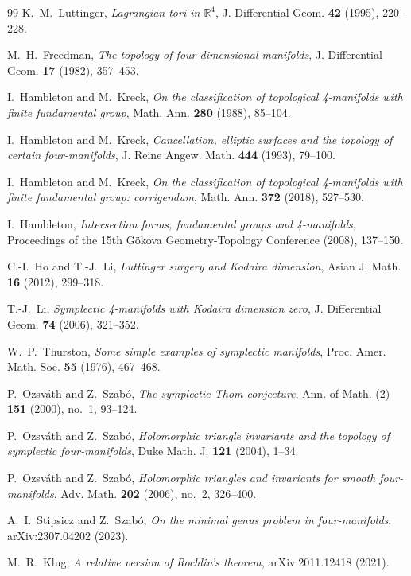 \documentclass[11pt]{article}
\newcommand{\R}{\mathbb{R}}
\theoremstyle{definition}
\begin{document}
\begin{thebibliography}{99}
K.~M.~Luttinger,
\emph{Lagrangian tori in $\R^4$},
J. Differential Geom. \textbf{42} (1995), 220--228.

M.~H.~Freedman,
\emph{The topology of four-dimensional manifolds},
J. Differential Geom. \textbf{17} (1982), 357--453.

I.~Hambleton and M.~Kreck,
\emph{On the classification of topological 4-manifolds with finite
fundamental group},
Math. Ann. \textbf{280} (1988), 85--104.

I.~Hambleton and M.~Kreck,
\emph{Cancellation, elliptic surfaces and the topology of certain
four-manifolds},
J. Reine Angew. Math. \textbf{444} (1993), 79--100.

I.~Hambleton and M.~Kreck,
\emph{On the classification of topological 4-manifolds with finite
fundamental group: corrigendum},
Math. Ann. \textbf{372} (2018), 527--530.

I.~Hambleton,
\emph{Intersection forms, fundamental groups and 4-manifolds},
Proceedings of the 15th G\"okova Geometry-Topology Conference (2008),
137--150.

C.-I.~Ho and T.-J.~Li,
\emph{Luttinger surgery and Kodaira dimension},
Asian J. Math. \textbf{16} (2012), 299--318.

T.-J.~Li,
\emph{Symplectic 4-manifolds with Kodaira dimension zero},
J. Differential Geom. \textbf{74} (2006), 321--352.

W.~P.~Thurston,
\emph{Some simple examples of symplectic manifolds},
Proc. Amer. Math. Soc. \textbf{55} (1976), 467--468.

P.~Ozsv\'ath and Z.~Szab\'o,
\emph{The symplectic Thom conjecture},
Ann. of Math. (2) \textbf{151} (2000), no.~1, 93--124.

P.~Ozsv\'ath and Z.~Szab\'o,
\emph{Holomorphic triangle invariants and the topology of symplectic
four-manifolds},
Duke Math. J. \textbf{121} (2004), 1--34.

P.~Ozsv\'ath and Z.~Szab\'o,
\emph{Holomorphic triangles and invariants for smooth four-manifolds},
Adv. Math. \textbf{202} (2006), no.~2, 326--400.

A.~I.~Stipsicz and Z.~Szab\'o,
\emph{On the minimal genus problem in four-manifolds},
arXiv:2307.04202 (2023).

M.~R.~Klug,
\emph{A relative version of Rochlin's theorem},
arXiv:2011.12418 (2021).


\end{thebibliography}
\end{document}
